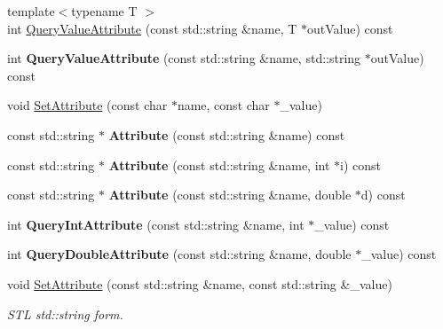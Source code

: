 \begin{DoxyCompactItemize}
{\footnotesize template$<$typename T $>$ }\\int \hyperlink{class_ti_xml_element_a7530db879b81ebaba61bf62a9770d204}{Query\+Value\+Attribute} (const std\+::string \&name, T $\ast$out\+Value) const
\item 
\mbox{\label{class_ti_xml_element_aad40c4f4f34f854862e6a719e83ad713}} 
int {\bfseries Query\+Value\+Attribute} (const std\+::string \&name, std\+::string $\ast$out\+Value) const
\item 
void \hyperlink{class_ti_xml_element_abf0b3bd7f0e4c746a89ec6e7f101fc32}{Set\+Attribute} (const char $\ast$name, const char $\ast$\+\_\+value)
\item 
\mbox{\label{class_ti_xml_element_aa0533e0dc704ce9f38308c9cfbe705e5}} 
const std\+::string $\ast$ {\bfseries Attribute} (const std\+::string \&name) const
\item 
\mbox{\label{class_ti_xml_element_a88cc395de3e5460bb96a42cb9d5ef096}} 
const std\+::string $\ast$ {\bfseries Attribute} (const std\+::string \&name, int $\ast$i) const
\item 
\mbox{\label{class_ti_xml_element_a4f624b438f8a969df782649ea258c98b}} 
const std\+::string $\ast$ {\bfseries Attribute} (const std\+::string \&name, double $\ast$d) const
\item 
\mbox{\label{class_ti_xml_element_aa368685cfa6efae820b8e7ec18114865}} 
int {\bfseries Query\+Int\+Attribute} (const std\+::string \&name, int $\ast$\+\_\+value) const
\item 
\mbox{\label{class_ti_xml_element_a442a0180263ff9a61d30711dc213d9e4}} 
int {\bfseries Query\+Double\+Attribute} (const std\+::string \&name, double $\ast$\+\_\+value) const
\item 
void \hyperlink{class_ti_xml_element_a80ed65b1d194c71c6c9986ae42337d7d}{Set\+Attribute} (const std\+::string \&name, const std\+::string \&\+\_\+value)
\begin{DoxyCompactList}\small\item\em S\+TL std\+::string form. \end{DoxyCompactList}\item 
\mbox{\label{class_ti_xml_element_a6f18d54fbe25bbc527936ee65363b3c5}} 

\end{DoxyCompactItemize}
